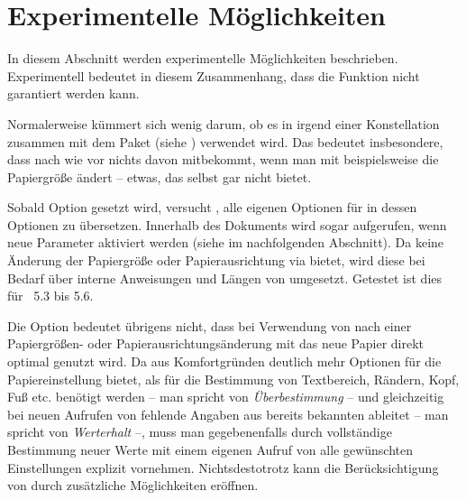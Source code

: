 \section{Experimentelle Möglichkeiten}

In diesem Abschnitt werden experimentelle Möglichkeiten
beschrieben. Experimentell bedeutet in diesem Zusammenhang, dass die Funktion
nicht garantiert werden kann.
\iffalse %
Dafür kann es zwei Gründe geben. Zum einen
steht die endgültige Funktion oder Implementierung eventuell noch nicht
abschließend fest. Zum anderen hängen die Möglichkeiten teilweise von Interna
anderer Pakete ab und können deshalb in ihrer Funktion nur so lange garantiert
werden, wie diese anderen Pakete nicht geändert werden.
\fi

\begin{Declaration}
\end{Declaration}
Normalerweise kümmert sich  wenig darum, ob es in irgend
einer Konstellation zusammen mit dem Paket
 (siehe \cite{package:geometry})
verwendet wird. Das bedeutet insbesondere, dass  nach wie
vor nichts davon mitbekommt, wenn man mit  beispielsweise
die Papiergröße ändert -- etwas, das  selbst gar nicht
bietet.

Sobald Option 
gesetzt wird, versucht , alle eigenen Optionen für
 in dessen Optionen zu übersetzen. Innerhalb des Dokuments
wird sogar  aufgerufen, wenn neue Parameter aktiviert
werden (siehe  im nachfolgenden
Abschnitt). Da  keine Änderung der Papiergröße oder
Papierausrichtung via  bietet, wird diese bei Bedarf über
interne Anweisungen und Längen von  umgesetzt. Getestet ist
dies für ~5.3 bis 5.6.

Die Option bedeutet übrigens nicht, dass bei Verwendung von 
nach einer Papiergrößen- oder Papierausrichtungsänderung mit
 das neue Papier direkt optimal genutzt wird. Da
 aus Komfortgründen deutlich mehr Optionen für die
Papiereinstellung bietet, als für die Bestimmung von Textbereich, Rändern,
Kopf, Fuß etc. benötigt werden -- man spricht von \emph{Überbestimmung} -- und
gleichzeitig bei neuen Aufrufen von  fehlende Angaben aus
bereits bekannten ableitet -- man spricht von \emph{Werterhalt} --,
muss man gegebenenfalls durch vollständige Bestimmung neuer Werte
mit einem eigenen Aufruf von  alle gewünschten
Einstellungen explizit vornehmen. Nichtsdestotrotz kann die Berücksichtigung
von  durch  zusätzliche Möglichkeiten
eröffnen.

